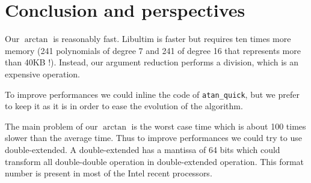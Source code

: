 \section{Conclusion and perspectives}

Our $\arctan$ is reasonably fast.  Libultim is faster but requires ten
times more memory (241 polynomials of degree 7 and 241 of degree 16
that represents more than 40KB !). Instead, our argument reduction
performs a division, which is an expensive operation.

To improve performances we could inline the code of \texttt{atan\_quick},
but we prefer to keep it as it is in order to ease the evolution of the
algorithm.

The main problem of our $\arctan$ is the worst case time which is about 100
times slower than the average time. Thus to improve performances we could
try to use double-extended. A double-extended has a mantissa of 64 bits
which could transform all double-double operation in double-extended
operation. This format number is present in most of the Intel recent
processors.


